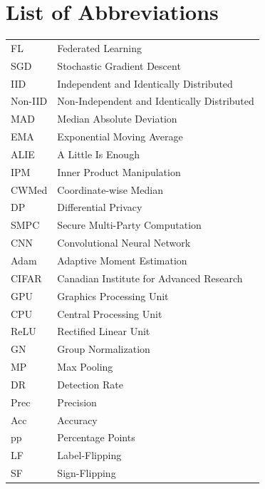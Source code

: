 \chapter*{List of Abbreviations}
\begin{tabular}{ll}
FL & Federated Learning \\
SGD & Stochastic Gradient Descent \\
IID & Independent and Identically Distributed \\
Non-IID & Non-Independent and Identically Distributed \\
MAD & Median Absolute Deviation \\
EMA & Exponential Moving Average \\
ALIE & A Little Is Enough \\
IPM & Inner Product Manipulation \\
CWMed & Coordinate-wise Median \\
DP & Differential Privacy \\
SMPC & Secure Multi-Party Computation \\
CNN & Convolutional Neural Network \\
Adam & Adaptive Moment Estimation \\
CIFAR & Canadian Institute for Advanced Research \\
GPU & Graphics Processing Unit \\
CPU & Central Processing Unit \\
ReLU & Rectified Linear Unit \\
GN & Group Normalization \\
MP & Max Pooling \\
DR & Detection Rate \\
Prec & Precision \\
Acc & Accuracy \\
pp & Percentage Points \\
LF & Label-Flipping \\
SF & Sign-Flipping \\
\end{tabular}
